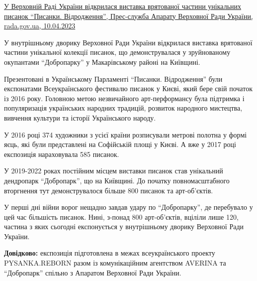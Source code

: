 \begin{center}
	\begin{fminipage}{0.9\textwidth}
\href{https://www.rada.gov.ua/news/razom/235113.html}{%
У Верховній Раді України відкрилася виставка врятованої частини унікальних писанок \enquote{Писанки. Відродження}, %
Прес-служба Апарату Верховної Ради України, rada.gov.ua, 10.04.2023%
}

У внутрішньому дворику Верховної Ради України відкрилася виставка врятованої
частини унікальної колекції писанок, що демонструвалася у зруйнованому
окупантами \enquote{Добропарку} у Макарівському районі на Київщині.

Презентовані в Українському Парламенті \enquote{Писанки. Відродження} були експонатами
Всеукраїнського фестивалю писанок у Києві, який бере свій початок із 2016 року.
Головною метою незвичайного арт-перформансу була підтримка і популяризація
українських народних традицій, розвиток народного мистецтва, вивчення культури
та історії Українського народу. 

У 2016 році 374 художники з усієї країни розписували метрові полотна у формі
яєць, які були представлені на Софійській площі у Києві. А вже у 2017 році
експозиція нараховувала 585 писанок.

У 2019-2022 роках постійним місцем виставки писанок став унікальний дендропарк
\enquote{Добропарк}, що на Київщині. До початку повномасштабного вторгнення тут
демонструвалося  більше 800 писанок та арт-об'єктів.

У перші дні війни ворог нещадно завдав удару по \enquote{Добропарку}, де перебувало у
цей час більшість писанок. Нині, з-понад 800 арт-об'єктів, вціліли лише 120,
частина з яких сьогодні експонується у внутрішньому дворику Верховної Ради
України.

\textbf{Довідково:} експозиція підготовлена в межах всеукраїнського проекту
PYSANKA.REBORN разом із комунікаційним агентством AVERINA та \enquote{Добропарк}
спільно з Апаратом Верховної Ради України.


	\end{fminipage}
\end{center}

